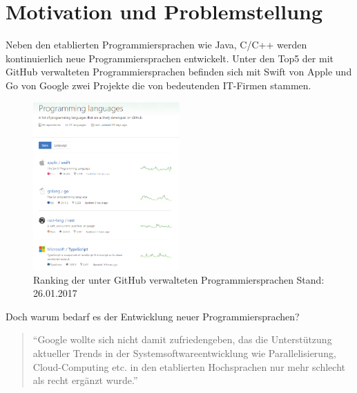 \documentclass[
    paper=a4,
    bibtotocnumbered,
    liststotocnumbered,
    oneside,
    12pt,
    listof=totoc,
    toc=chapterentrywithdots,
    listof=entryprefix,
]{scrartcl}
\begin{document}

\section{Motivation und Problemstellung}
Neben den etablierten Programmiersprachen wie Java, C/C++ werden kontinuierlich neue Programmiersprachen entwickelt. 
Unter den Top5 der mit GitHub verwalteten Programmiersprachen befinden sich mit Swift von Apple und Go von Google zwei Projekte die von bedeutenden IT-Firmen stammen.

	\begin{figure}[h]
	\centering
	\includegraphics[width=0.5\textwidth]{Images/github}
	\caption{Ranking der unter GitHub verwalteten Programmiersprachen Stand: 26.01.2017}%
	\label{figure:github}%
	\end{figure}

Doch warum bedarf es der Entwicklung neuer Programmiersprachen?
\begin{quote}
\enquote{Google wollte sich nicht damit zufriedengeben, das die Unterstützung aktueller Trends in der Systemsoftwareentwicklung wie Parallelisierung, Cloud-Computing etc. in den etablierten Hochsprachen nur mehr schlecht als recht ergänzt wurde.} \cite{Feike2011}
\end{quote}
\end{document}
